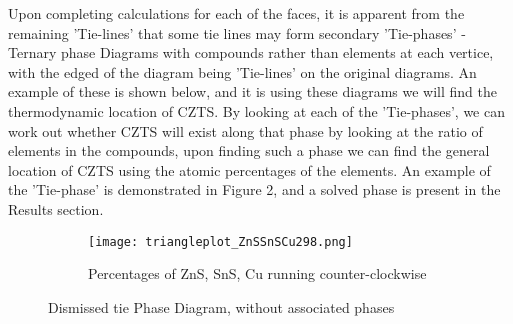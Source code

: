 Upon completing calculations for each of the faces, it is apparent from the remaining 'Tie-lines' that some tie lines may form secondary 'Tie-phases' - Ternary phase Diagrams with compounds rather than elements at each vertice, with the edged of the diagram being 'Tie-lines' on the original diagrams. An example of these is shown below, and it is using these diagrams we will find the thermodynamic location of CZTS. By looking at each of the 'Tie-phases', we can  work out whether CZTS will exist along that phase by looking at the ratio of elements in the compounds, upon finding such a phase we can find the general location of CZTS using the atomic percentages of the elements. An example of the 'Tie-phase' is demonstrated in Figure 2, and a solved phase is present in the Results section.

\begin{figure}
\centering
\begin{subfigure}{80mm}
 \centering
    \texttt{[image: triangleplot\_ZnSSnSCu298.png]}
    \caption{Percentages of ZnS, SnS, Cu running counter-clockwise}
    \label{fig:ZnSSnSCu}
\end{subfigure}%
\caption{Dismissed tie Phase Diagram, without associated phases}
\label{fig:ZnSSnSCuFig}
\end{figure}

